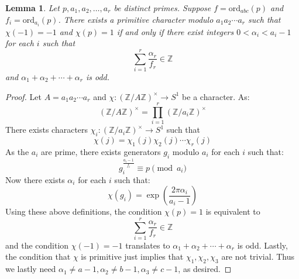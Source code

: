 \documentclass{article}
\newcommand{\Z}{\mathbb{Z}}
\newcommand{\ord}[0]{\mathrm{ord}}
\newtheorem{lemma}[theorem]{Lemma}
\theoremstyle{definition}
\theoremstyle{definition}
\theoremstyle{remark}
\begin{document}
\begin{lemma} \label{lem:char_prim_conditions} Let $p,a_1,a_2, \ldots,a_r$ be distinct primes. Suppose $f = \ord_{abc}(p)$ and $f_i = \ord_{a_i}(p)$. There exists a primitive character modulo $a_1a_2\cdots a_r$ such that $\chi(-1) = -1$ and $\chi(p) = 1$ if and only if there exist integers $0 < \alpha_i < a_i - 1$ for each $i$ such that
\[ \sum_{i=1}^{r} \frac{\alpha_r}{f_r}\in \Z\]
and $\alpha_1 + \alpha_2 +\cdots + \alpha_r$ is odd.
\end{lemma}
\begin{proof} Let $A = a_1a_2\cdots a_r$ and $\chi: (\Z/A\Z)^{\times} \to S^1$ be a character. As:
\[ (\Z/A\Z)^{\times}  =  \prod_{i=1}^r (\Z/a_i\Z)^{\times} \]
There exists characters $\chi_i: (\Z/a_i\Z)^{\times} \to S^1$ such that
\[\chi(j) = \chi_1(j)\chi_2(j)\cdots\chi_r(j)\]
As the $a_i$ are prime, there exists generators $g_i$ modulo $a_i$ for each $i$ such that:
\begin{equation*}
g_i^{\frac{a_i-1}{f_i}} \equiv p \pmod{a_i}
\end{equation*}
Now there exists $\alpha_i$ for each $i$ such that:
\begin{equation*}
\chi(g_i) = \exp\left(\frac{2\pi \alpha_i}{a_i-1}\right) 
\end{equation*}
Using these above definitions, the condition $\chi(p) = 1$ is equivalent to
\[ \sum_{i=1}^{r} \frac{\alpha_r}{f_r}\in \Z\]
and the condition $\chi(-1) = -1$ translates to $\alpha_1 + \alpha_2 +\cdots + \alpha_r$ is odd. Lastly, the condition that $\chi$ is primitive just implies that $\chi_1, \chi_2, \chi_3$ are not trivial. Thus we lastly need $\alpha_1 \neq a - 1, \alpha_2 \neq b - 1, \alpha_3 \neq c - 1$, as desired.
\end{proof}
\end{document}
